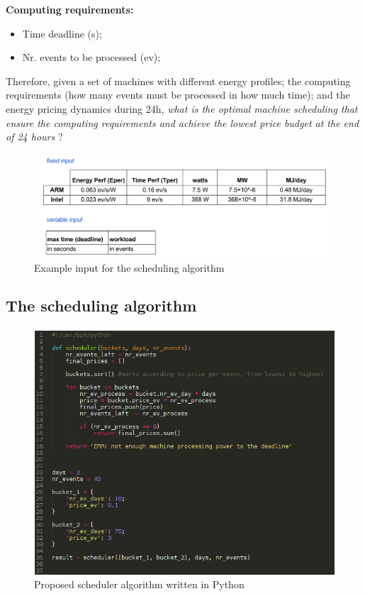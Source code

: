\vspace{5mm}

\textbf{Computing requirements:}
\begin{itemize}
  \item[] Time deadline (s);
  \item[] Nr. events to be processed (ev);
\end{itemize}

\vspace{10mm}

Therefore, given a set of machines with different energy profiles; the computing requirements (how many events must be processed in how much time); and the energy pricing dynamics during 24h, \textit{what is the optimal machine scheduling that ensure the computing requirements and achieve the lowest price budget at the end of 24 hours} ?

\begin{figure}[h]
  \centering
    \includegraphics[width=150mm]{"img/input"}
    \caption{Example input for the scheduling algorithm}
    \label{fig:input}
\end{figure}

\subsection*{The scheduling algorithm}

\begin{figure}[h]
  \centering
    \includegraphics[width=150mm]{"img/scheduler_code"}
    \caption{Proposed scheduler algorithm written in Python}
    \label{fig:sheduler_code}
\end{figure}


